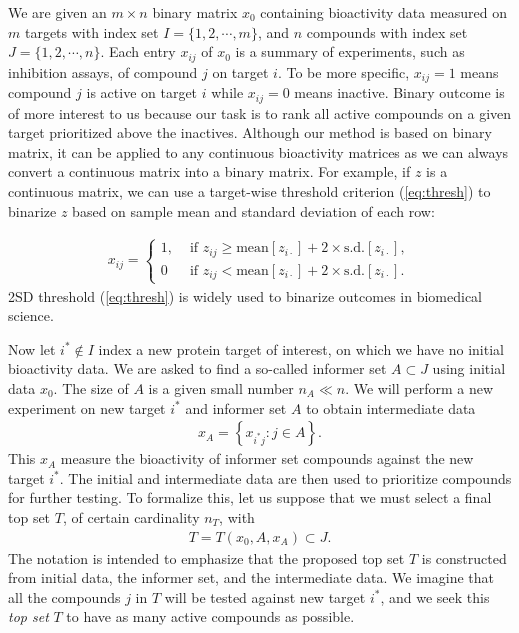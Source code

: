 \documentclass[12pt]{article}
\begin{document}
We are given an $m \times n$ binary matrix $x_0$ containing bioactivity data measured on $m$ targets with index set $I = \{1,2,\cdots,m\}$, and $n$ compounds with index set $J=\{1,2,\cdots,n\}$.  Each entry $x_{ij}$ of $x_0$ is a summary of experiments, such as inhibition assays,
of compound $j$ on target $i$. To be more specific, $x_{ij} = 1$ means compound $j$ is active on target $i$ while $x_{ij} = 0$ means inactive. Binary outcome is of more interest to us because our task is to rank all active compounds on a given target prioritized above the inactives. Although our method is based on binary matrix, it can be applied to any continuous bioactivity matrices as we can always convert a continuous matrix into a binary matrix. For example, if $z$ is a continuous matrix, we can use a target-wise threshold criterion (\ref{eq:thresh}) to binarize $z$ based on sample mean and standard deviation of each row:

\begin{eqnarray}\label{eq:thresh}
x_{ij} = \begin{cases}
		1, &\text{ if }
	      z_{ij} \geq \mbox{mean}[z_{i\cdot}] + 2 \times \mbox{s.d.}[z_{i\cdot}],\\
		0 & \text{ if }
	      z_{ij} < \mbox{mean}[z_{i\cdot}] + 2 \times \mbox{s.d.}[z_{i\cdot}].
	\end{cases}
\end{eqnarray}
2SD threshold (\ref{eq:thresh}) is widely used to binarize outcomes in biomedical science.  

Now let $i^* \notin I$ index a new protein target of interest, on which we have no initial bioactivity data.   
We are asked to find a so-called informer set $A \subset J$ using initial data $x_0$. The size of $A$ is a
given small number $n_A \ll n$. We will perform
a new experiment on new target $i^*$ and informer set $A$ to obtain intermediate data 
\begin{eqnarray*}
x_{A} = \left\{ x_{i^*j}: j \in A \right\}.
\end{eqnarray*}
This $x_A$ measure the bioactivity of informer
set compounds against the new target $i^*$.  The initial and intermediate
data are then used to prioritize compounds for further testing.
To formalize this, let us suppose that we must select a final
top set $T$, of certain cardinality $n_T$, with
\begin{eqnarray*}
T = T\left( x_0, A, x_A \right) \subset J.
\end{eqnarray*}
The notation is intended to emphasize that the proposed top set $T$ is constructed
from initial data, the informer set, and the intermediate data.
We imagine that all the compounds $j$ in $T$ will be
tested against new target $i^*$, and we seek this  {\em top set} $T$ to have as many
active compounds as possible.
\end{document}
